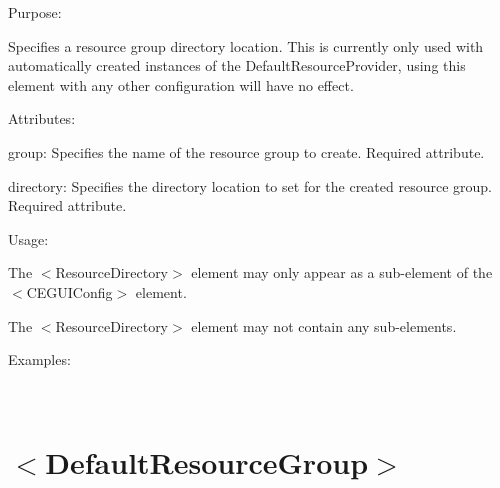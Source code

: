 \begin{DoxyItemize}
\item Purpose\+:
\begin{DoxyItemize}
\item Specifies a resource group directory location. This is currently only used with automatically created instances of the Default\+Resource\+Provider, using this element with any other configuration will have no effect.
\end{DoxyItemize}
\item Attributes\+:
\begin{DoxyItemize}
\item {\ttfamily group\+:} Specifies the name of the resource group to create. Required attribute.
\item {\ttfamily directory\+:} Specifies the directory location to set for the created resource group. Required attribute.
\end{DoxyItemize}
\item Usage\+:
\begin{DoxyItemize}
\item The $<$Resource\+Directory$>$ element may only appear as a sub-\/element of the $<$C\+E\+G\+U\+I\+Config$>$ element.
\item The $<$Resource\+Directory$>$ element may not contain any sub-\/elements.
\end{DoxyItemize}
\item Examples\+:
\end{DoxyItemize}

~\newline
 \hypertarget{xml_config_xml_config_defaultresourcegroup}{}\section{$<$\+Default\+Resource\+Group$>$}\label{xml_config_xml_config_defaultresourcegroup}

